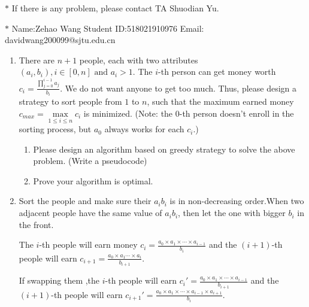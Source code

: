 \documentclass[12pt,a4paper]{article}
\makeatletter
\newtheorem*{solution}{Solution}
\theoremstyle{definition}
\renewenvironment{solution}[1][Solution] {\par\pushQED{\qed}\normalfont\topsep6\p@\@plus6\p@\relax\trivlist\item[\hskip\labelsep\bfseries#1\@addpunct{.}]\ignorespaces}{\popQED\endtrivlist\@endpefalse} \makeatother
\makeatother
\begin{document}
\noindent

\noindent{}
\begin{center}
\footnotesize{\color{red}$*$ If there is any problem, please contact TA Shuodian Yu.}

\footnotesize{\color{blue}$*$ Name:Zehao Wang  \quad Student ID:518021910976 \quad Email: davidwang200099@sjtu.edu.cn}
\end{center}

\begin{enumerate}
    \item
    There are $n+1$ people, each with two attributes $(a_i,b_i), i\in[0,n] \text{ and } a_i>1$. The $i$-th person can get money worth $c_i = \frac{\prod_{j=0}^{i-1}{a_j}}{b_i}$. We do not want anyone to get too much. Thus, please design a strategy to sort people from $1$ to $n$, such that the maximum earned money $c_{max}=\max\limits_{1\leq i\leq n} c_i$ is minimized. (Note: the 0-th person doesn't enroll in the sorting process, but $a_0$ always works for each $c_i$.)
    \begin{enumerate}
        \item Please design an algorithm based on greedy strategy to solve the above problem. (Write a pseudocode)
        \item Prove your algorithm is optimal.
    \end{enumerate}

    \begin{solution}
        Sort the people and make sure their $a_i b_i$ is in non-decreasing order.When two adjacent people have the same value of $a_i b_i$, then let the one with bigger $b_i$ in the front.
        
        The $i$-th people will earn money $c_i=\frac{a_0\times a_1\times\cdots\times a_{i-1} }{b_i}$ and the $(i+1)$-th people will earn $c_{i+1}=\frac{a_0\times a_1\cdots\times a_i}{b_{i+1}}$.
        
        If swapping them ,the $i$-th people will earn $c_i'=\frac{a_0\times a_1\times\cdots\times a_{i-1}}{b_{i+1}}$ and the $(i+1)$-th people will earn $c_{i+1}'=\frac{a_0\times a_1\times\cdots \times a_{i-1}\times a_{i+1}}{b_i}$.
        

\end{solution}
\end{enumerate}
\end{document}
